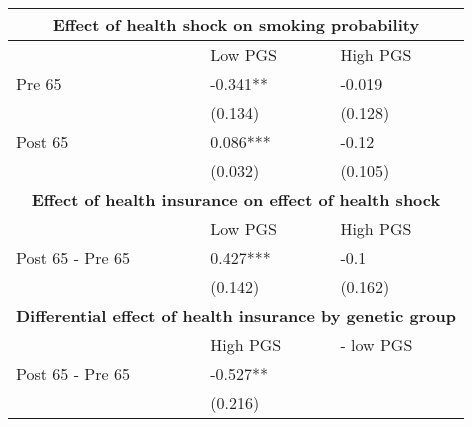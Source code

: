 % 
\begin{tabular}{lll}
  \toprule
  \multicolumn{3}{c}{ \textbf{Effect of health shock on smoking probability}} \\
 \midrule
 & Low PGS & High PGS \\ 
   \midrule
Pre 65 & -0.341** & -0.019 \\ 
   & (0.134) & (0.128) \\ 
  Post 65 & 0.086*** & -0.12 \\ 
   & (0.032) & (0.105) \\ 
   \toprule \multicolumn{3}{c}{ \textbf{Effect of health insurance on effect of health shock}} \\
 \midrule
 & Low PGS & High PGS \\ 
   \midrule
Post 65 - Pre 65 & 0.427*** & -0.1 \\ 
   & (0.142) & (0.162) \\ 
   \toprule \multicolumn{3}{c}{ \textbf{Differential effect of health insurance by genetic group}} \\
 \midrule
 & High PGS  & - low PGS \\ 
   \midrule
Post 65 - Pre 65 & -0.527** &  \\ 
   & (0.216) &  \\ 
   \bottomrule
\end{tabular}
